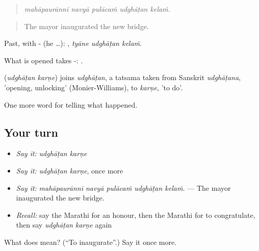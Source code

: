 \begin{quote}
\emph{mahāpaurānnī navyā pulācaṁ udghāṭan kelaṁ.}
\end{quote}

\begin{quote}
The mayor inaugurated the new bridge.
\end{quote}

Past, with - (he …):   , \emph{tyāne udghāṭan kelaṁ}.

What is opened takes -:   .

\begin{cousinweb}
\textbf{ } (\emph{udghāṭan karṇe}) joins \emph{udghāṭan}, a tatsama taken from Sanskrit \emph{udghāṭana}, 'opening, unlocking' (Monier-Williams), to \emph{karṇe}, 'to do'.
\end{cousinweb}

\begin{grammarlens}[title={What you've built}]
One more word for telling what happened.
\end{grammarlens}

\subsection*{Your turn}
\begin{itemize}
\raggedright
  \item \emph{Say it:} \emph{udghāṭan karṇe}
  \item \emph{Say it:} \emph{udghāṭan karṇe}, once more
  \item \emph{Say it:} \emph{mahāpaurānnī navyā pulācaṁ udghāṭan kelaṁ.} — The mayor inaugurated the new bridge.
  \item \emph{Recall:} say the Marathi for an honour, then the Marathi for to congratulate, then say \emph{udghāṭan karṇe} again
\end{itemize}

\begin{tcolorbox}[breakable,colback=teal!4,colframe=teal!35!black,title={Before you move on}]
What does   mean? (\textquotedblleft{}To inaugurate\textquotedblright{}.) Say it once more.
\end{tcolorbox}
